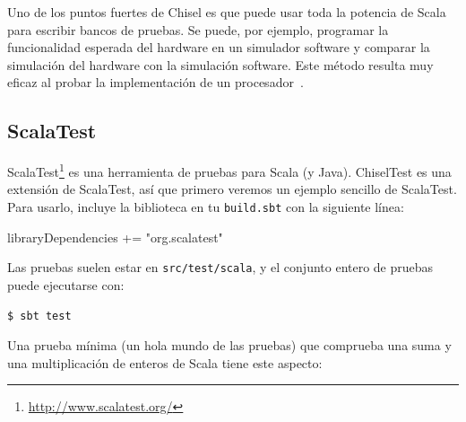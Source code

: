 \documentclass[%
    10pt,
    headinclude, footinclude=false,
    openright, %
    notitlepage,
    cleardoublepage=empty,
    headsepline,
    numbers=noenddot,
    bibliography=totoc, index=totoc,
    ]{scrbook}
\newcommand{\code}[1]{{\lstinline[basicstyle=\small\ttfamily]{#1}}}
\newcommand{\myref}[2]{\href{#1}{#2}}
\renewcommand{\myref}[2]{{#2}{\footnote{\url{#1}}}}
\begin{document}
Uno de los puntos fuertes de Chisel es que puede usar toda la potencia de Scala para escribir
bancos de pruebas. Se puede, por ejemplo, programar la funcionalidad esperada del hardware
en un simulador software y comparar la simulación del hardware con la
simulación software. Este método resulta muy eficaz al probar la implementación
de un procesador~\cite{lipsi:arcs2018}.

\subsection{ScalaTest}


\myref{http://www.scalatest.org/}{ScalaTest} es una herramienta de pruebas para Scala (y Java). ChiselTest es
una extensión de ScalaTest, así que primero veremos un ejemplo sencillo de ScalaTest. Para usarlo, incluye
la biblioteca en tu \code{build.sbt} con la siguiente línea:

\begin{chisel}
libraryDependencies += "org.scalatest" %
\end{chisel}


\noindent Las pruebas suelen estar en \code{src/test/scala}, y el conjunto entero de pruebas puede
ejecutarse con:

\begin{verbatim}
$ sbt test
\end{verbatim}


\noindent Una prueba mínima (un hola mundo de las pruebas) que comprueba una suma y una
multiplicación de enteros de Scala tiene este aspecto:


\end{document}
